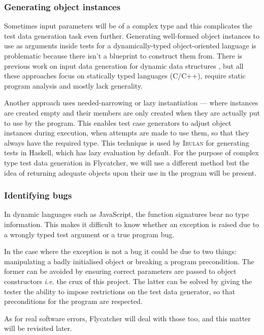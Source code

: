 \subsubsection{Generating object instances}
Sometimes input parameters will be of a complex type and this complicates the test data generation task even further. Generating well-formed object instances to use as arguments inside tests for a dynamically-typed object-oriented language is problematic because there isn't a blueprint to construct them from. There is previous work on input data generation for dynamic data structures \cite{korel1990automated, visvanathan2002generating, sai2005address, zhao2007automatic}, but all these approaches focus on statically typed languages (C/C++), require static program analysis and mostly lack generality.

Another approach uses needed-narrowing \cite{antoy1994needed} or lazy instantiation \cite{lindblad2007property} --- where instances are created empty and their members are only created when they are actually put to use by the program. This enables test case generators to adjust object instances during execution, when attempts are made to use them, so that they always have the required type. This technique is used by \textsc{Irulan} \cite{allwood2011high} for generating tests in Haskell, which has lazy evaluation by default. For the purpose of complex type test data generation in \textsf{Flycatcher}, we will use a different method but the idea of returning adequate objects upon their use in the program will be present.

\subsubsection{Identifying bugs}

In dynamic languages such as JavaScript, the function signatures bear no type information. This makes it difficult to know whether an exception is raised due to a wrongly typed test argument or a true program bug.

In the case where the exception is not a bug it could be due to two things: manipulating a badly initialised object or breaking a program precondition. The former can be avoided by ensuring correct parameters are passed to object constructors \emph{i.e.} the crux of this project. The latter can be solved by giving the tester the ability to impose restrictions on the test data generator, so that preconditions for the program are respected.

As for real software errors, \textsf{Flycatcher} will deal with those too, and this matter will be revisited later.

